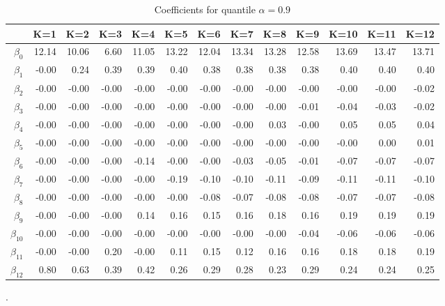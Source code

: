\begin{table}[ht]
\centering
\begin{tabular}{rrrrrrrrrrrrr}
  \hline
 & K=1 & K=2 & K=3 & K=4 & K=5 & K=6 & K=7 & K=8 & K=9 & K=10 & K=11 & K=12 \\ 
  \hline
$\beta_{0}$ & 12.14 & 10.06 & 6.60 & 11.05 & 13.22 & 12.04 & 13.34 & 13.28 & 12.58 & 13.69 & 13.47 & 13.71 \\ 
  $\beta_{1}$ & -0.00 & 0.24 & 0.39 & 0.39 & 0.40 & 0.38 & 0.38 & 0.38 & 0.38 & 0.40 & 0.40 & 0.40 \\ 
  $\beta_{2}$ & -0.00 & -0.00 & -0.00 & -0.00 & -0.00 & -0.00 & -0.00 & -0.00 & -0.00 & -0.00 & -0.00 & -0.02 \\ 
  $\beta_{3}$ & -0.00 & -0.00 & -0.00 & -0.00 & -0.00 & -0.00 & -0.00 & -0.00 & -0.01 & -0.04 & -0.03 & -0.02 \\ 
  $\beta_{4}$ & -0.00 & -0.00 & -0.00 & -0.00 & -0.00 & -0.00 & -0.00 & 0.03 & -0.00 & 0.05 & 0.05 & 0.04 \\ 
  $\beta_{5}$ & -0.00 & -0.00 & -0.00 & -0.00 & -0.00 & -0.00 & -0.00 & -0.00 & -0.00 & -0.00 & 0.00 & 0.01 \\ 
  $\beta_{6}$ & -0.00 & -0.00 & -0.00 & -0.14 & -0.00 & -0.00 & -0.03 & -0.05 & -0.01 & -0.07 & -0.07 & -0.07 \\ 
  $\beta_{7}$ & -0.00 & -0.00 & -0.00 & -0.00 & -0.19 & -0.10 & -0.10 & -0.11 & -0.09 & -0.11 & -0.11 & -0.10 \\ 
  $\beta_{8}$ & -0.00 & -0.00 & -0.00 & -0.00 & -0.00 & -0.08 & -0.07 & -0.08 & -0.08 & -0.07 & -0.07 & -0.08 \\ 
  $\beta_{9}$ & -0.00 & -0.00 & -0.00 & 0.14 & 0.16 & 0.15 & 0.16 & 0.18 & 0.16 & 0.19 & 0.19 & 0.19 \\ 
  $\beta_{10}$ & -0.00 & -0.00 & -0.00 & -0.00 & -0.00 & -0.00 & -0.00 & -0.00 & -0.04 & -0.06 & -0.06 & -0.06 \\ 
  $\beta_{11}$ & -0.00 & -0.00 & 0.20 & -0.00 & 0.11 & 0.15 & 0.12 & 0.16 & 0.16 & 0.18 & 0.18 & 0.19 \\ 
  $\beta_{12}$ & 0.80 & 0.63 & 0.39 & 0.42 & 0.26 & 0.29 & 0.28 & 0.23 & 0.29 & 0.24 & 0.24 & 0.25 \\ 
   \hline
\end{tabular}
\caption{Coefficients for quantile $\alpha = 0.9$}.
\end{table}
